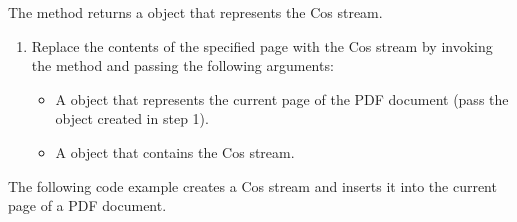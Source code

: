 \documentclass[letterpaper,12pt,english,openany,oneside]{sphinxmanual}
\begin{document}
The  method returns a  object that represents the Cos stream.
\begin{enumerate}
%
\item {} 
Replace the contents of the specified page with the Cos stream by invoking the  method and passing the following arguments:
\begin{itemize}
\item {} 
A  object that represents the current page of the PDF document (pass the  object created in step 1).

\item {} 
A  object that contains the Cos stream.

\end{itemize}

\end{enumerate}

The following code example creates a Cos stream and inserts it into the current page of a PDF document.
\end{document}

